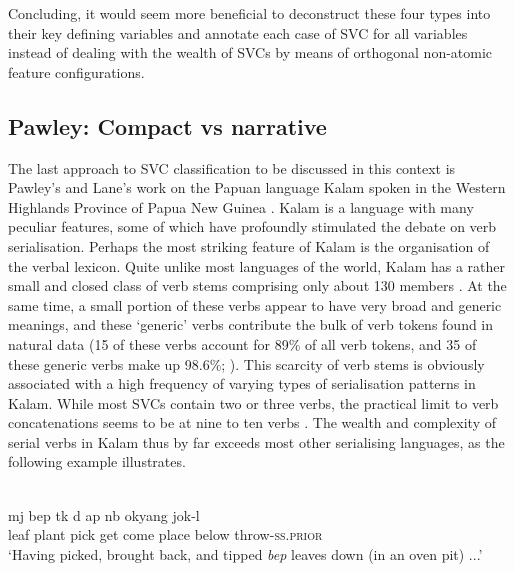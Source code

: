 Concluding, it would seem more beneficial to deconstruct these four types into their key defining variables and annotate each case of SVC for all variables instead of dealing with the wealth of SVCs by means of orthogonal non-atomic feature configurations. 

\subsection{Pawley: Compact vs narrative}

The last approach to SVC classification to be discussed in this context is Pawley's and Lane's work on the Papuan language Kalam spoken in the Western Highlands Province of Papua New Guinea \citep{Pawley1987, pawley1991saying, pawley2008serial, pawley2011event, lane2008kalam}. Kalam is a language with many peculiar features, some of which have profoundly stimulated the debate on verb serialisation. Perhaps the most striking feature of Kalam is the organisation of the verbal lexicon. Quite unlike most languages of the world, Kalam has a rather small and closed class of verb stems comprising only about 130 members \citep[7]{lane2008kalam}. At the same time, a small portion of these verbs appear to have very broad and generic meanings, and these `generic' verbs contribute the bulk of verb tokens found in natural data (15 of these verbs account for 89\% of all verb tokens, and 35 of these generic verbs make up 98.6\%; \citealt[7]{lane2008kalam}). This scarcity of verb stems is obviously associated with a high frequency of varying types of serialisation patterns in Kalam. While most SVCs contain two or three verbs, the practical limit to verb concatenations seems to be at nine to ten verbs \citep[172]{pawley2008serial}. The wealth and complexity of serial verbs in Kalam thus by far exceeds most other serialising languages, as the following example illustrates.

\ea \label{kalam1}
\\
\gll mj bep tk d ap nb okyang jok-l \\
leaf plant pick get come place below throw-\textsc{ss}.\textsc{prior} \\
\glft `Having picked, brought back, and tipped \textit{bep} leaves down (in an oven pit) ...'\\ 
\z

